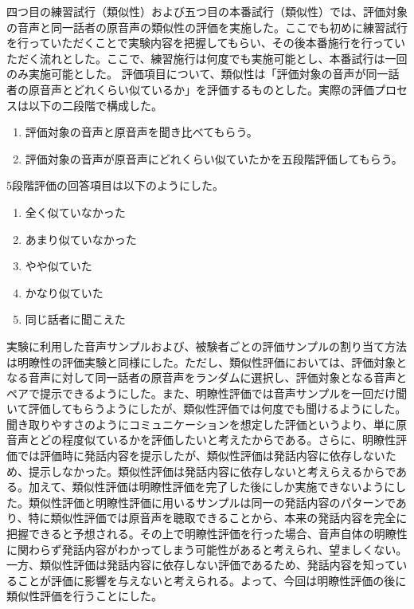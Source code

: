 \documentclass[12pt]{jarticle}
\numberwithin{equation}{section}    %
\numberwithin{figure}{section}      %
\numberwithin{table}{section}      %
\begin{document}
四つ目の練習試行（類似性）および五つ目の本番試行（類似性）では、評価対象の音声と同一話者の原音声の類似性の評価を実施した。ここでも初めに練習試行を行っていただくことで実験内容を把握してもらい、その後本番施行を行っていただく流れとした。ここで、練習施行は何度でも実施可能とし、本番試行は一回のみ実施可能とした。
評価項目について、類似性は「評価対象の音声が同一話者の原音声とどれくらい似ているか」を評価するものとした。実際の評価プロセスは以下の二段階で構成した。
\begin{enumerate}
    \item 評価対象の音声と原音声を聞き比べてもらう。
    \item 評価対象の音声が原音声にどれくらい似ていたかを五段階評価してもらう。
\end{enumerate}
5段階評価の回答項目は以下のようにした。
\begin{enumerate}
    \item 全く似ていなかった
    \item あまり似ていなかった
    \item やや似ていた
    \item かなり似ていた
    \item 同じ話者に聞こえた
\end{enumerate}
実験に利用した音声サンプルおよび、被験者ごとの評価サンプルの割り当て方法は明瞭性の評価実験と同様にした。ただし、類似性評価においては、評価対象となる音声に対して同一話者の原音声をランダムに選択し、評価対象となる音声とペアで提示できるようにした。また、明瞭性評価では音声サンプルを一回だけ聞いて評価してもらうようにしたが、類似性評価では何度でも聞けるようにした。聞き取りやすさのようにコミュニケーションを想定した評価というより、単に原音声とどの程度似ているかを評価したいと考えたからである。さらに、明瞭性評価では評価時に発話内容を提示したが、類似性評価は発話内容に依存しないため、提示しなかった。類似性評価は発話内容に依存しないと考えらえるからである。加えて、類似性評価は明瞭性評価を完了した後にしか実施できないようにした。類似性評価と明瞭性評価に用いるサンプルは同一の発話内容のパターンであり、特に類似性評価では原音声を聴取できることから、本来の発話内容を完全に把握できると予想される。その上で明瞭性評価を行った場合、音声自体の明瞭性に関わらず発話内容がわかってしまう可能性があると考えられ、望ましくない。一方、類似性評価は発話内容に依存しない評価であるため、発話内容を知っていることが評価に影響を与えないと考えられる。よって、今回は明瞭性評価の後に類似性評価を行うことにした。
\end{document}
